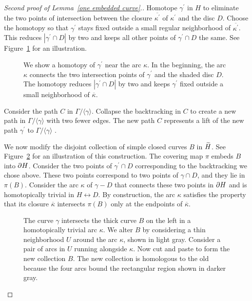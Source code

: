 \begin{proof}[Second proof of Lemma~\ref{one embedded curve}.]
Homotope $\gamma^{\prime}$ in $H$ to eliminate the two points of intersection between the closure $\overline{\kappa^{\prime}}$ of $\kappa^{\prime}$ and the disc $D$.  Choose the homotopy so that $\gamma^{\prime}$ stays fixed outside a small regular neighborhood of $\overline{\kappa^{\prime}}$.  This reduces $|\gamma^{\prime}\cap D|$ by two and keeps all other points of $\gamma^{\prime}\cap D$ the same.  See Figure~\ref{homotopy} for an illustration.

\begin{figure}
\caption{
We show a homotopy of $\gamma^{\prime}$ near the arc $\kappa$.  In the beginning, the arc $\kappa$ connects the two intersection points of $\gamma^{\prime}$ and the shaded disc $D$.  The homotopy reduces $|\gamma^{\prime}\cap D|$ by two and keeps $\gamma^{\prime}$ fixed outside a small neighborhood of $\overline{\kappa}$.
}
\label{homotopy}
\end{figure}

Consider the path $C$ in $\Gamma/\langle\gamma\rangle$.  Collapse the backtracking in $C$ to create a new path in $\Gamma/\langle\gamma\rangle$ with two fewer edges.  The new path $C$ represents a lift of the new path $\gamma^{\prime}$ to $\Gamma/\langle\gamma\rangle$ .

We now modify the disjoint collection of simple closed curves $B$ in $\widetilde{H}$.  See Figure~\ref{recursionstep} for an illustration of this construction.  The covering map $\pi$ embeds $B$ into $\partial H$.  Consider the two points of $\gamma^{\prime}\cap D$ corresponding to the backtracking we chose above.  These two points correspond to two points of $\gamma\cap D$, and they lie in $\pi(B)$.  Consider the arc $\kappa$ of $\gamma-D$ that connects these two points in $\partial H$ and is homotopically trivial in $H \rel D$.  By construction, the arc $\kappa$ satisfies the property that its closure $\overline{\kappa}$ intersects $\pi(B)$ only at the endpoints of $\overline{\kappa}$.

\begin{figure}
\caption{
The curve $\gamma$ intersects the thick curve $B$ on the left in a homotopically trivial arc $\kappa$.  We alter $B$ by considering a thin neighborhood $U$ around the arc $\kappa$, shown in light gray.  Consider a pair of arcs in $U$ running alongside $\kappa$.  Now cut and paste to form the new collection $B$.  The new collection is homologous to the old because the four arcs bound the rectangular region shown in darker gray.
}
\label{recursionstep}
\end{figure}


\end{proof}
